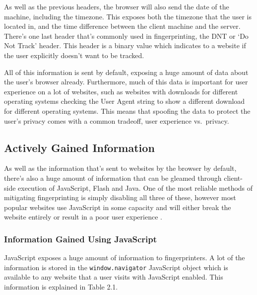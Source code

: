 As well as the previous headers, the browser will also send the date of the machine, including the timezone.
This exposes both the timezone that the user is located in, and the time difference between the client machine and the server.
There's one last header that's commonly used in fingerprinting, the DNT or `Do Not Track' header.
This header is a binary value which indicates to a website if the user explicitly doesn't want to be tracked.

All of this information is sent by default, exposing a huge amount of data about the user's browser already.
Furthermore, much of this data is important for user experience on a lot of websites, such as websites with downloads for different operating systems checking the User Agent string to show a different download for different operating systems.
This means that spoofing the data to protect the user's privacy comes with a common tradeoff, user experience vs.\ privacy.

\subsection{Actively Gained Information}

As well as the information that's sent to websites by the browser by default, there's also a huge amount of information that can be gleamed through client-side execution of JavaScript, Flash and Java.
One of the most reliable methods of mitigating fingerprinting is simply disabling all three of these, however most popular websites use JavaScript in some capacity and will either break the website entirely or result in a poor user experience \citep{disable-js}.

\subsubsection{Information Gained Using JavaScript}

JavaScript exposes a huge amount of information to fingerprinters.
A lot of the information is stored in the \texttt{window.navigator} JavaScript object which is available to any website that a user visits with JavaScript enabled.
This information is explained in Table 2.1.

